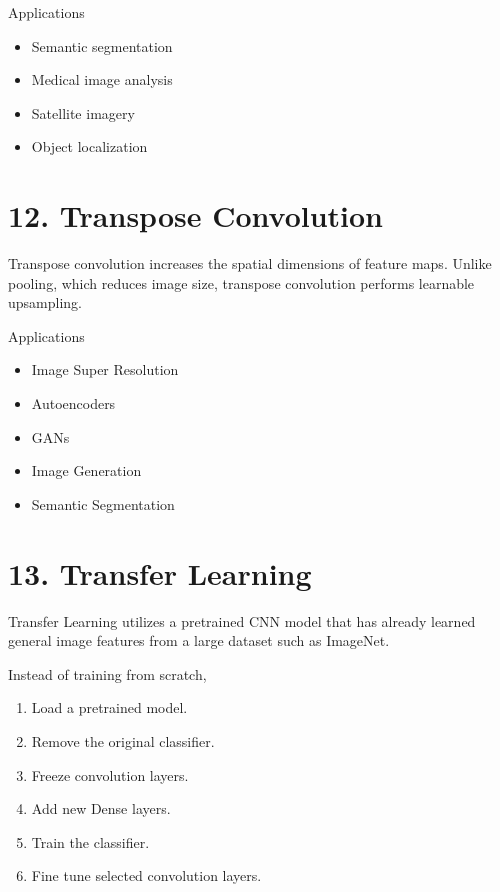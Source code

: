 \documentclass[11pt]{article}
\begin{document}
Applications

\begin{itemize}
\item Semantic segmentation
\item Medical image analysis
\item Satellite imagery
\item Object localization
\end{itemize}


\section*{12. Transpose Convolution}

Transpose convolution increases the spatial dimensions of feature maps.
Unlike pooling, which reduces image size, transpose convolution performs
learnable upsampling.

Applications

\begin{itemize}
\item Image Super Resolution
\item Autoencoders
\item GANs
\item Image Generation
\item Semantic Segmentation
\end{itemize}


\section*{13. Transfer Learning}

Transfer Learning utilizes a pretrained CNN model that has already learned
general image features from a large dataset such as ImageNet.

Instead of training from scratch,

\begin{enumerate}
\item Load a pretrained model.
\item Remove the original classifier.
\item Freeze convolution layers.
\item Add new Dense layers.
\item Train the classifier.
\item Fine tune selected convolution layers.
\end{enumerate}
\end{document}

